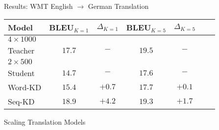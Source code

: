 \begin{frame}{Results: WMT English $\rightarrow$ German Translation}
\air
\air
\begin{table}
\centering
\begin{tabular}{lccccrr}
\toprule
Model &    BLEU$_{K=1}$   & $\Delta_{K=1}$ & BLEU$_{K=5}$ & $\Delta_{K=5}$ \\%
\midrule
$4 \times 1000$ \\
Teacher    & $17.7$ &  $-$ & $19.5$&   $-$ \\%
\midrule
\pause
$2 \times 500$ \\
  Student  $\,$   & $14.7$ & $-$ & $17.6$&  $-$ \\%
  \pause
\hspace{1mm} Word-KD  & $15.4$ & $+0.7$& $17.7$& $+0.1$\\%
\pause
\hspace{1mm} Seq-KD  & $18.9$ & $+\mathbf{4.2}$&$19.3$ & $+\mathbf{1.7}$ \\ %
\bottomrule
\end{tabular}

\end{table}
\air
\air
\end{frame}



\begin{frame}{Scaling Translation Models}

  \begin{center}
  \end{center}
\end{frame}

